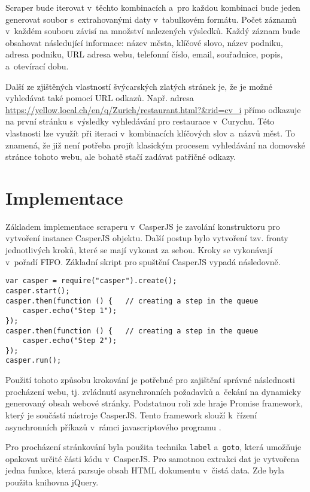 \documentclass[11pt,a4paper]{article}
\begin{document}
Scraper bude iterovat v~těchto kombinacích a~pro každou kombinaci bude jeden generovat soubor s~extrahovanými daty v~tabulkovém formátu. Počet záznamů v~každém souboru závisí na množství nalezených výsledků. Každý záznam bude obsahovat následující informace: název města, klíčové slovo, název podniku, adresa podniku, URL adresa webu, telefonní číslo, email, souřadnice, popis, a~otevírací dobu.

Další ze zjištěných vlastností švýcarských zlatých stránek je, že je možné vyhledávat také pomocí URL odkazů. Např. adresa \url{https://yellow.local.ch/en/q/Zurich/restaurant.html?&rid=cv_i} přímo odkazuje na první stránku s~výsledky vyhledávání pro restaurace v~Curychu. Této vlastnosti lze využít při iteraci v~kombinacích klíčových slov a~názvů měst. To znamená, že již není potřeba projít klasickým procesem vyhledávání na domovské stránce tohoto webu, ale bohatě stačí zadávat patřičné odkazy.

\newpage


\section{Implementace}
Základem implementace scraperu v~CasperJS je zavolání konstruktoru pro vytvoření instance CasperJS objektu. Další postup bylo vytvoření tzv. fronty jednotlivých kroků, které se mají vykonat za sebou. Kroky se vykonávají v~pořadí FIFO. Základní skript pro spuštění CasperJS vypadá následovně.

\begin{lstlisting}[caption=Základní skript pro CasperJS]
var casper = require("casper").create();
casper.start();
casper.then(function () {   // creating a step in the queue
    casper.echo("Step 1");
});
casper.then(function () {   // creating a step in the queue
    casper.echo("Step 2");
});
casper.run();
\end{lstlisting}

Použití tohoto způsobu krokování je potřebné pro zajištění správné následnosti procházení webu, tj. zvládnutí asynchronních požadavků a~čekání na dynamicky generovaný obsah webové stránky. Podstatnou roli zde hraje Promise framework, který je součástí nástroje CasperJS. Tento framework slouží k~řízení asynchronních příkazů v~rámci javascriptového programu \cite{sugrue}.

Pro procházení stránkování byla použita technika \texttt{label} a~\texttt{goto}, která umožňuje opakovat určité části kódu v~CasperJS. Pro samotnou extrakci dat je vytvořena jedna funkce, která parsuje obsah HTML dokumentu v~čistá data. Zde byla použita knihovna jQuery.
\end{document}
